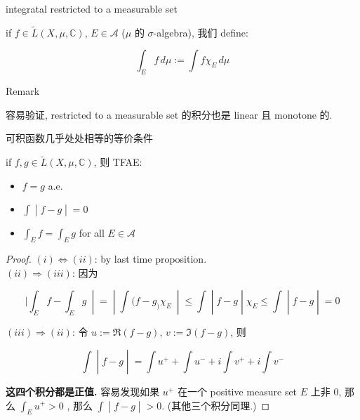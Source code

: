 \documentclass{qlnotes-export}
\begin{document}
\begin{definition}{integratal restricted to a measurable set}\label{def-05-integration-of-real-and-complex-functions-integratal-restricted-to-a-measurable-set}

if \(f \in \widetilde{L}(X,\mu,{\mathbb{C}})\), \(E \in \mathcal{A}\) (\(\mu\) 的 \(\sigma\)-algebra), 我们 define:

\[\int_{E}f\, d\mu := \int f\chi_{E}\, d\mu\]

\end{definition}

\begin{qlremark}{Remark}

容易验证, restricted to a measurable set 的积分也是 linear 且 monotone 的.

\end{qlremark}

\begin{proposition}{可积函数几乎处处相等的等价条件}\label{prop-05-integration-of-real-and-complex-functions-proposition-004}

if \(f,g \in \widetilde{L}(X,\mu,{\mathbb{C}})\), 则 TFAE:

\begin{itemize}
\item
  \(f = g\) a.e.
\item
  \(\left. \int \middle| f - g \middle| = 0 \right.\)
\item
  \(\int_{E}f = \int_{E}g\) for all \(E \in \mathcal{A}\)
\end{itemize}

\end{proposition}

\begin{proof}

\((i)\Leftrightarrow(ii)\): by last time proposition.\\
\((ii)\Longrightarrow(iii)\): 因为

\[\left. |\int_{E}f - \int_{E}g\  \middle| = \middle| \int(f - g_{)}\chi_{E}\  \middle| \leq \int \middle| f - g \middle| \chi_{E} \leq \int \middle| f - g \middle| = 0 \right.\]

\((iii)\Longrightarrow(ii)\): 令 \(u := \Re(f - g)\), \(v := \Im(f - g)\), 则

\[\left. \int \middle| f - g \middle| = \int u^{+} + \int u^{-} + i\int v^{+} + i\int v^{-} \right.\]

\textbf{这四个积分都是正值.} 容易发现如果 \(u^{+}\) 在一个 positive measure set \(E\) 上非 0, 那么 \(\int_{E}u^{+} > 0\) , 那么 \(\left. \int \middle| f - g \middle| > 0 \right.\). (其他三个积分同理.)

\end{proof}
\end{document}
